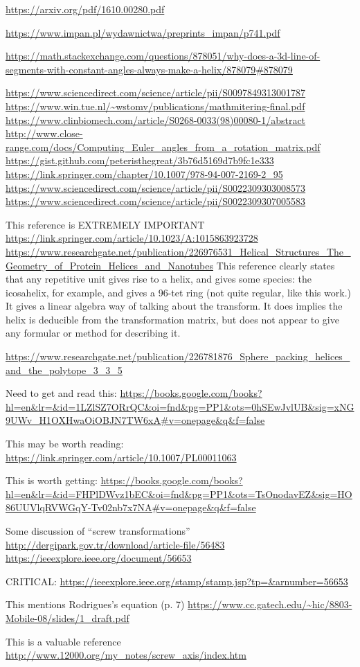 \documentclass[11pt]{article}
\begin{document}
\url{https://arxiv.org/pdf/1610.00280.pdf}

\url{https://www.impan.pl/wydawnictwa/preprints_impan/p741.pdf}

\url{https://math.stackexchange.com/questions/878051/why-does-a-3d-line-of-segments-with-constant-angles-always-make-a-helix/878079#878079}

\url{https://www.sciencedirect.com/science/article/pii/S0097849313001787}
\url{https://www.win.tue.nl/~wstomv/publications/mathmitering-final.pdf}
\url{https://www.clinbiomech.com/article/S0268-0033(98)00080-1/abstract}
\url{http://www.close-range.com/docs/Computing_Euler_angles_from_a_rotation_matrix.pdf}
\url{https://gist.github.com/peteristhegreat/3b76d5169d7b9fc1e333}
\url{https://link.springer.com/chapter/10.1007/978-94-007-2169-2_95}
\url{https://www.sciencedirect.com/science/article/pii/S0022309303008573}
\url{https://www.sciencedirect.com/science/article/pii/S0022309307005583}

This reference is EXTREMELY IMPORTANT
\url{https://link.springer.com/article/10.1023/A:1015863923728}
\url{https://www.researchgate.net/publication/226976531_Helical_Structures_The_Geometry_of_Protein_Helices_and_Nanotubes}
This reference clearly states that any repetitive unit gives rise to a helix, and gives some species: the icosahelix, for example, and gives a 96-tet ring (not quite regular, like this work.)  It gives a linear algebra way of talking about the transform. It does implies the helix is deducible from the transformation matrix, but does not appear to give any formular or method for describing it.

\url{https://www.researchgate.net/publication/226781876_Sphere_packing_helices_and_the_polytope_3_3_5}


Need to get and read this:
\url{https://books.google.com/books?hl=en&lr=&id=1LZlSZ7ORrQC&oi=fnd&pg=PP1&ots=0hSEwJvlUB&sig=xNG9UWv_H1OXHwaOiOBJN7TW6xA#v=onepage&q&f=false}

This may be worth reading:
\url{https://link.springer.com/article/10.1007/PL00011063}

This is worth getting:
\url{https://books.google.com/books?hl=en&lr=&id=FHPlDWvz1bEC&oi=fnd&pg=PP1&ots=TsOnodavEZ&sig=HO86UUVlqRVWGqY-Tv02nb7x7NA#v=onepage&q&f=false}

Some discussion of ``screw transformations''
\url{http://dergipark.gov.tr/download/article-file/56483}
\url{https://ieeexplore.ieee.org/document/56653}

CRITICAL:
\url{https://ieeexplore.ieee.org/stamp/stamp.jsp?tp=&arnumber=56653}

This mentions Rodrigues's equation (p. 7)
\url{https://www.cc.gatech.edu/~hic/8803-Mobile-08/slides/1_draft.pdf}

This is a valuable reference
\url{http://www.12000.org/my_notes/screw_axis/index.htm}




\end{document}
